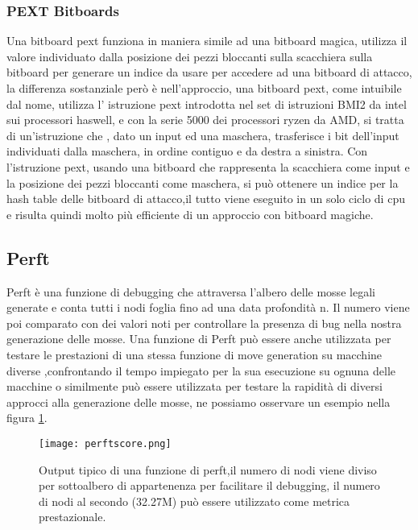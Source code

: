 \subsubsection{PEXT Bitboards}
Una bitboard pext funziona in maniera simile ad una bitboard magica, utilizza il valore individuato dalla posizione dei pezzi bloccanti sulla scacchiera sulla bitboard per generare un indice da usare per accedere ad una
bitboard di attacco, la differenza sostanziale però è nell'approccio, una bitboard pext, come intuibile dal nome, utilizza l' istruzione pext introdotta nel set di istruzioni BMI2 da intel sui processori haswell, e con 
la serie 5000 dei processori ryzen da AMD, si tratta di un'istruzione che , dato un input ed una maschera, trasferisce i bit dell'input individuati dalla maschera, in ordine contiguo e da destra a sinistra.
Con l'istruzione pext, usando una bitboard che rappresenta la scacchiera come input e la posizione dei pezzi bloccanti come maschera, si può ottenere un indice per la hash table delle bitboard di attacco,il tutto viene eseguito in un solo ciclo 
di cpu e risulta quindi molto più efficiente di un approccio con bitboard magiche.


\subsection{Perft}
Perft è una funzione di debugging che attraversa l'albero delle mosse legali generate e conta tutti i nodi foglia fino ad una data profondità n.
Il numero viene poi comparato con dei valori noti per controllare la presenza di bug nella nostra generazione delle mosse.
Una funzione di Perft può essere anche utilizzata per testare le prestazioni di una stessa funzione di move generation su macchine diverse ,confrontando il tempo impiegato per la sua esecuzione su ognuna delle macchine
o similmente può essere utilizzata per testare la rapidità di diversi approcci alla generazione delle mosse, ne possiamo osservare un esempio nella figura \ref{perftscore}.


\begin{figure}[H]
    \centering
    \texttt{[image: perftscore.png]}
    \caption{Output tipico di una funzione di perft,il numero di nodi viene diviso per sottoalbero di appartenenza per facilitare il debugging, il numero di nodi al secondo (32.27M) può essere utilizzato come metrica prestazionale.}
    \label{perftscore}
\end{figure}


